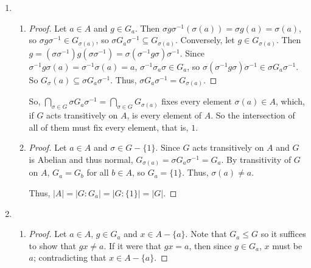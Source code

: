\documentclass[11pt, letterpaper]{article}
\begin{document}
\begin{enumerate}
\begin{proof}
    $\phi$ is clearly injective and $\sigma(S_{n - 2}) \leq A_n$ since every permutation in $\sigma(S_{n - 2})$ is even by construction. So $\phi: S_{n - 2} \to \phi(S_{n - 2}) \leq A$ defines an isomorphism. 
  \end{proof}

  \item \begin{enumerate}
    \item \begin{proof} Let $a \in A$ and $g \in G_a$. Then $\sigma g \sigma^{-1} (\sigma(a)) = \sigma g (a) = \sigma(a)$, so $\sigma g \sigma^{-1} \in G_{\sigma(a)}$, so $\sigma G_a \sigma^{-1} \subseteq G_{\sigma(a)}$. Conversely, let $g \in G_{\sigma(a)}$. Then $g = (\sigma\sigma^{-1})g(\sigma\sigma^{-1}) = \sigma(\sigma^{-1}g\sigma)\sigma^{-1}$. Since $\sigma^{-1}g\sigma(a) = \sigma^{-1}\sigma(a) = a$, $\sigma^{-1}\sigma_a\sigma \in G_a$, so $\sigma(\sigma^{-1}g\sigma)\sigma^{-1} \in \sigma G_a\sigma^{-1}$. So $G_\sigma(a) \subseteq \sigma G_a\sigma^{-1}$. Thus, $\sigma G_a \sigma^{-1} = G_{\sigma(a)}$. \end{proof}
    
    So,
    $
    \bigcap_{\sigma \in G} \sigma G_a \sigma^{-1} 
    = \bigcap_{\sigma \in G} G_{\sigma(a)}$ fixes every element $\sigma(a) \in A$, which, if $G$ acts transitively on $A$, is every element of $A$. So the intersection of all of them must fix every element, that is, $1$.
    \item \begin{proof}
      Let $a \in A$ and $\sigma \in G - \lbrace 1 \rbrace$. Since $G$ acts transitively on $A$ and $G$ is Abelian and thus normal, $G_{\sigma(a)} = \sigma G_a \sigma^{-1} = G_a$. By transitivity of $G$ on $A$, $G_a = G_b$ for all $b \in A$, so $G_a = \lbrace 1 \rbrace$. Thus, $\sigma(a) \neq a$.

      Thus, $\vert A \vert = \vert G : G_a \vert = \vert G : \lbrace 1 \rbrace \vert = \vert G \vert$.
    \end{proof}
  \end{enumerate}

  \item \begin{enumerate}
    \item \begin{proof}
      Let $a \in A$, $g \in G_a$ and $x \in A - \lbrace a \rbrace$. Note that $G_a \leq G$ so it suffices to show that $gx \neq a$. If it were that $gx = a$, then since $g \in G_a$, $x$ must be $a$; contradicting that $x \in A - \lbrace a \rbrace$.
    \end{proof}


\end{enumerate}
\end{enumerate}
\end{document}
